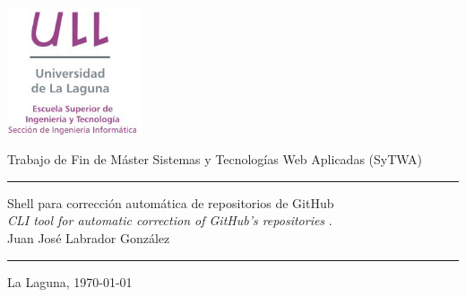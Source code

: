 \documentclass[spanish,a4paper,14pt,oneside]{extreport}
\begin{document}
\renewcommand{\thepage}{\roman{page}}
\setcounter{page}{1}

\renewcommand\listtablename{Índice de Tablas}      %
\renewcommand\listfigurename{Índice de Figuras}    %


\pagestyle{empty}
\thispagestyle{empty}


\newcommand{\HRule}{\rule{\linewidth}{1mm}}
\setlength{\parindent}{0mm}
\setlength{\parskip}{0mm}


\begin{center}
	\includegraphics[width=0.3\textwidth]{images/logo_vertical}
\end{center}

\begin{center}
{\Huge Trabajo de Fin de Máster}
{\Huge Sistemas y Tecnologías Web Aplicadas (SyTWA)}
\end{center}

\HRule
\begin{flushright}
        {\Huge Shell para corrección automática de repositorios de GitHub} \\[2.5mm]
        {\Large \textit{CLI tool for automatic correction of GitHub's repositories} .} \\[5mm]
        {\Large Juan José Labrador González} \\[5mm]


\end{flushright}
\HRule
{}
\begin{center}
  \Large La Laguna, \today
\end{center}
\end{document}
